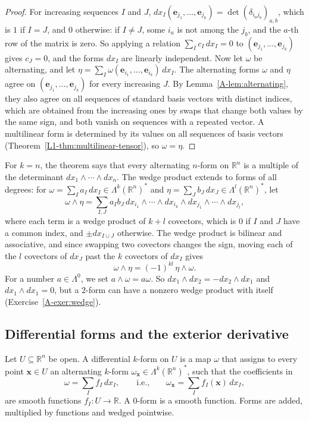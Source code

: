 \begin{proof}
    For increasing sequences $I$ and $J$, $dx_I(\mathbf{e}_{j_1}, \ldots, \mathbf{e}_{j_k}) = \det(\delta_{i_aj_b})_{a,b}$, which is $1$ if $I = J$, and $0$ otherwise: if $I \neq J$, some $i_a$ is not among the $j_b$, and the $a$-th row of the matrix is zero. So applying a relation $\sum_I c_I\, dx_I = 0$ to $(\mathbf{e}_{j_1}, \ldots, \mathbf{e}_{j_k})$ gives $c_J = 0$, and the forms $dx_I$ are linearly independent. Now let $\omega$ be alternating, and let $\eta = \sum_I \omega(\mathbf{e}_{i_1}, \ldots, \mathbf{e}_{i_k})\, dx_I$. The alternating forms $\omega$ and $\eta$ agree on $(\mathbf{e}_{j_1}, \ldots, \mathbf{e}_{j_k})$ for every increasing $J$. By Lemma~\ref{A-lem:alternating}, they also agree on all sequences of standard basis vectors with distinct indices, which are obtained from the increasing ones by swaps that change both values by the same sign, and both vanish on sequences with a repeated vector. A multilinear form is determined by its values on all sequences of basis vectors (Theorem~\ref{L1-thm:multilinear-tensor}), so $\omega = \eta$.
\end{proof}

For $k = n$, the theorem says that every alternating $n$-form on $\mathbb{R}^n$ is a multiple of the determinant $dx_1 \wedge \cdots \wedge dx_n$. The wedge product extends to forms of all degrees: for $\omega = \sum_I a_I\, dx_I \in \Lambda^k(\mathbb{R}^n)^*$ and $\eta = \sum_J b_J\, dx_J \in \Lambda^l(\mathbb{R}^n)^*$, let
\[\omega \wedge \eta = \sum_{I, J} a_I b_J\, dx_{i_1} \wedge \cdots \wedge dx_{i_k} \wedge dx_{j_1} \wedge \cdots \wedge dx_{j_l},\]
where each term is a wedge product of $k + l$ covectors, which is $0$ if $I$ and $J$ have a common index, and $\pm dx_{I \cup J}$ otherwise. The wedge product is bilinear and associative, and since swapping two covectors changes the sign, moving each of the $l$ covectors of $dx_J$ past the $k$ covectors of $dx_I$ gives
\[\omega \wedge \eta = (-1)^{kl}\, \eta \wedge \omega.\]
For a number $a \in \Lambda^0$, we set $a \wedge \omega = a\omega$. So $dx_1 \wedge dx_2 = -dx_2 \wedge dx_1$ and $dx_1 \wedge dx_1 = 0$, but a $2$-form can have a nonzero wedge product with itself (Exercise~\ref{A-exer:wedge}).

\subsection{Differential forms and the exterior derivative}

\begin{definition}\label{A-def:differential-form}
    Let $U \subseteq \mathbb{R}^n$ be open. A differential $k$-form on $U$ is a map $\omega$ that assigns to every point $\mathbf{x} \in U$ an alternating $k$-form $\omega_{\mathbf{x}} \in \Lambda^k(\mathbb{R}^n)^*$, such that the coefficients in
    \[\omega = \sum_I f_I\, dx_I, \qquad \text{i.e.,} \qquad \omega_{\mathbf{x}} = \sum_I f_I(\mathbf{x})\, dx_I,\]
    are smooth functions $f_I: U \to \mathbb{R}$. A $0$-form is a smooth function. Forms are added, multiplied by functions and wedged pointwise.
\end{definition}

